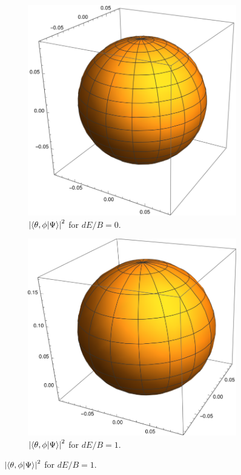 \documentclass{article}
\theoremstyle{definition}
\begin{document}
\begin{enumerate}[label=(\alph*)]
	\begin{figure}[!htb]
		\centering
		\begin{subfigure}{.5\textwidth}
			\centering
			\includegraphics[width=0.9\linewidth]{e0.eps}
			\caption{$\abs{\bra{\theta,\phi}\ket{\Psi}}^2$ for $dE/B=0$.}
			\label{fig:0}
		\end{subfigure}%
		\begin{subfigure}{.5\textwidth}
			\centering
			\includegraphics[width=.9\linewidth]{e1.eps}
			\caption{$\abs{\bra{\theta,\phi}\ket{\Psi}}^2$ for $dE/B=1$.}
			\label{fig:1}
		\end{subfigure}
	\end{figure}


\end{enumerate}
\end{document}

